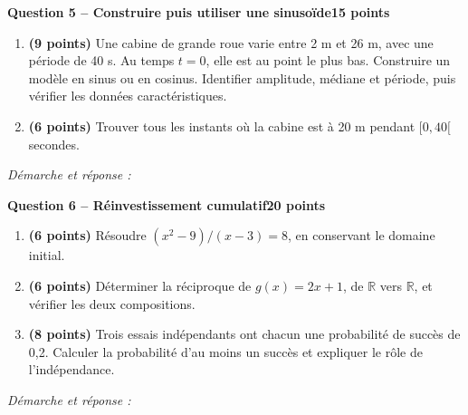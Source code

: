 \documentclass[11pt,a4paper]{article}
\begin{document}
\newpage
{\large\bfseries Question 5 -- Construire puis utiliser une sinusoïde}\hfill\textbf{15 points}\par
\begin{enumerate}
\item \textbf{(9 points)} Une cabine de grande roue varie entre 2 m et 26 m, avec une période de 40 s. Au temps \(t=0\), elle est au point le plus bas. Construire un modèle en sinus ou en cosinus. Identifier amplitude, médiane et période, puis vérifier les données caractéristiques.
\item \textbf{(6 points)} Trouver tous les instants où la cabine est à 20 m pendant \([0,40[\) secondes.
\end{enumerate}
\vspace{3mm}\textit{Démarche et réponse :}\par\vfill

\newpage
{\large\bfseries Question 6 -- Réinvestissement cumulatif}\hfill\textbf{20 points}\par
\begin{enumerate}
\item \textbf{(6 points)} Résoudre \((x^2-9)/(x-3)=8\), en conservant le domaine initial.
\item \textbf{(6 points)} Déterminer la réciproque de \(g(x)=2x+1\), de \(\mathbb R\) vers \(\mathbb R\), et vérifier les deux compositions.
\item \textbf{(8 points)} Trois essais indépendants ont chacun une probabilité de succès de 0,2. Calculer la probabilité d’au moins un succès et expliquer le rôle de l’indépendance.
\end{enumerate}
\vspace{3mm}\textit{Démarche et réponse :}\par\vfill
\end{document}
